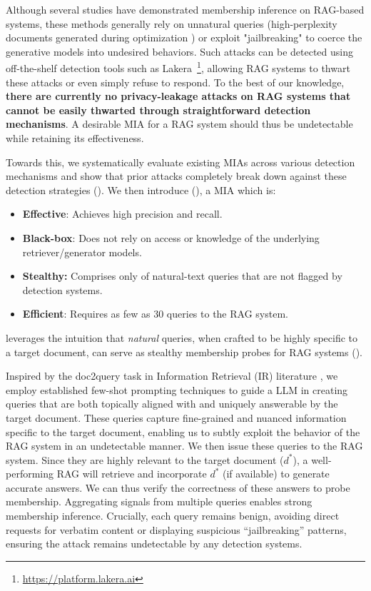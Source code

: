 Although several studies have demonstrated membership inference on RAG-based systems, these methods generally rely on unnatural queries (\eg high-perplexity documents generated during optimization \citep{ebrahimi2018hotflip,qin2022cold}) or exploit "jailbreaking" \citep{shin-etal-2020-autoprompt, wei2024jailbroken} to coerce the generative models into undesired behaviors. 
Such attacks can be detected using off-the-shelf detection tools such as Lakera~\footnote{\url{https://platform.lakera.ai}}, allowing RAG systems to thwart these attacks or even simply refuse to respond. To the best of our knowledge, \textbf{there are currently no privacy-leakage attacks on RAG systems that cannot be easily thwarted through straightforward detection mechanisms}. 
A desirable MIA for a RAG system should thus be undetectable while retaining its effectiveness.

Towards this, we systematically evaluate existing MIAs \citep{liu2024mask, anderson2024my, li2024generating} across various detection mechanisms and show that prior attacks completely break down against these detection strategies ().
We then introduce \ourattackfull (\ourattack), a MIA which is:
\begin{itemize}
    \item \textbf{Effective}: Achieves high precision and recall.
    \item \textbf{Black-box}: Does not rely on  access or knowledge of the underlying retriever/generator models.
    \item \textbf{Stealthy:} Comprises only of natural-text queries that are not flagged by detection systems.
    \item \textbf{Efficient}: Requires as few as 30 queries to the RAG system.
\end{itemize}
\ourattack leverages the intuition that \emph{natural} queries, when crafted to be highly specific to a target document, can serve as stealthy membership probes for RAG systems ().

Inspired by the doc2query task in Information Retrieval (IR) literature \cite{nogueira2019document, gospodinov2023doc2query}, we employ established few-shot prompting \cite{dai2023promptagator} techniques to guide a LLM in creating queries that are both topically aligned with and uniquely answerable by the target document.
These queries capture fine-grained and nuanced information specific to the target document, enabling us to subtly exploit the behavior of the RAG system in an undetectable manner.
We then issue these queries to the RAG system. Since they are highly relevant to the target document ($d^*$), a well-performing RAG will retrieve and incorporate $d^*$ (if available) to generate accurate answers. We can thus verify the correctness of these answers to probe membership. Aggregating signals from multiple queries enables strong membership inference. Crucially, each query remains benign, avoiding direct requests for verbatim content or displaying suspicious “jailbreaking” patterns, ensuring the attack remains undetectable by any detection systems.


